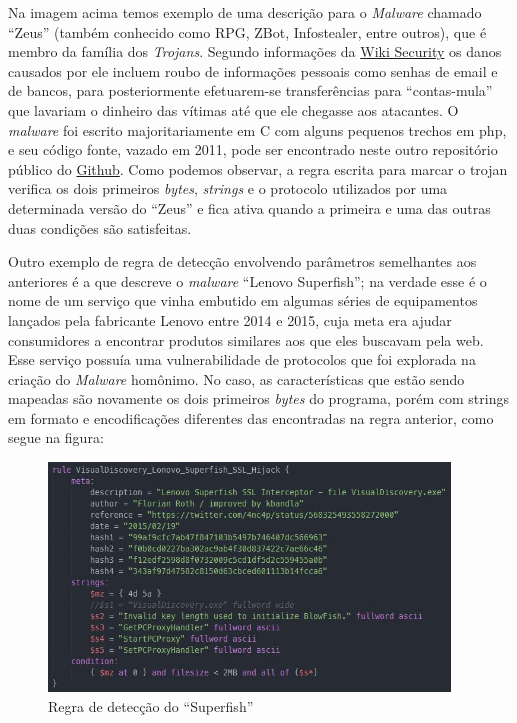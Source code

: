 Na imagem acima temos exemplo de uma descrição para o \textit{Malware} chamado ``Zeus''
(também conhecido como RPG, ZBot, Infostealer, entre outros), que é membro da
família dos \textit{Trojans}. Segundo informações da \href{www.wiki-security.com}{Wiki Security}\citeyear{wikisecurity} os danos causados por ele incluem roubo de informações pessoais como senhas de email e de bancos, para posteriormente efetuarem-se
transferências para ``contas-mula'' que lavariam o dinheiro das vítimas até
que ele chegasse aos atacantes. O \textit{malware} foi escrito majoritariamente em C
com alguns pequenos trechos em php, e seu código fonte, vazado em 2011, pode
ser encontrado neste outro repositório público do \href{https://github.com/Visgean/Zeus}{Github}.
Como podemos observar, a regra escrita para marcar o trojan verifica os dois primeiros \textit{bytes}, \textit{strings} e o protocolo utilizados por uma determinada versão do ``Zeus'' e fica ativa quando a primeira e uma das outras duas condições são satisfeitas.

Outro exemplo de regra de detecção envolvendo parâmetros semelhantes aos anteriores é a que descreve o \textit{malware} ``Lenovo Superfish''\citeyear{lenovosuperfish}; na verdade esse é o nome de um serviço que vinha embutido em algumas séries de equipamentos lançados pela fabricante Lenovo entre 2014 e 2015, cuja meta era ajudar consumidores a encontrar produtos similares aos que eles buscavam pela web. Esse serviço possuía uma vulnerabilidade de protocolos que foi explorada na criação do \textit{Malware} homônimo. No caso, as características que estão sendo mapeadas são novamente os dois primeiros \textit{bytes} do programa, porém com strings em formato e encodificações diferentes das encontradas na regra anterior, como segue na figura:

\begin{figure}[h]
	\centering
	\includegraphics[width=0.95\textwidth]{figs/superfish}
	\caption{Regra de detecção do ``Superfish''}
	\label{fig:superfish}
\end{figure}

